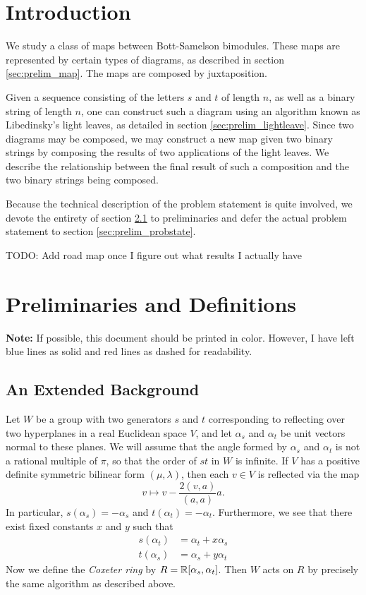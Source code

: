 
\section{Introduction}
We study a class of maps between Bott-Samelson bimodules.  These maps are represented by certain types of diagrams, as described in section \ref{sec:prelim_map}.  The maps are composed by juxtaposition.

Given a sequence consisting of the letters $s$ and $t$ of length $n$, as well as a binary string of length $n$, one can construct such a diagram using an algorithm known as Libedinsky's light leaves, as detailed in section \ref{sec:prelim_lightleave}.  Since two diagrams may be composed, we may construct a new map given two binary strings by composing the results of two applications of the light leaves.  We describe the relationship between the final result of such a composition and the two binary strings being composed.

Because the technical description of the problem statement is quite involved, we devote the entirety of section \ref{sec:prelim} to preliminaries and defer the actual problem statement to section \ref{sec:prelim_probstate}.  

TODO: Add road map once I figure out what results I actually have

\section{Preliminaries and Definitions}
\textbf{Note:} If possible, this document should be printed in color.  However, I have left blue lines as solid and red lines as dashed for readability.

\subsection{An Extended Background}
\label{sec:prelim}
Let $W$ be a group with two generators $s$ and $t$ corresponding to reflecting over two hyperplanes in a real Euclidean space $V$, and let $\alpha_s$ and $\alpha_t$ be unit vectors normal to these planes.  We will assume that the angle formed by $\alpha_s$ and $\alpha_t$ is not a rational multiple of $\pi$, so that the order of $st$ in $W$ is infinite.  If $V$ has a positive definite symmetric bilinear form $(\mu, \lambda)$, then each $v \in V$ is reflected via the map \[ v \mapsto v - \frac{2(v,a)}{(a,a)} a. \]  In particular, $s(\alpha_s) = -\alpha_s$ and $t(\alpha_t) = -\alpha_t$.  Furthermore, we see that there exist fixed constants $x$ and $y$ such that
\begin{align*}
	s(\alpha_t) &= \alpha_t + x \alpha_s \\
	t(\alpha_s) &= \alpha_s + y \alpha_t
\end{align*}
Now we define the \emph{Coxeter ring} by $R = \mathbb R[\alpha_s, \alpha_t]$.  Then $W$ acts on $R$ by precisely the same algorithm as described above.

